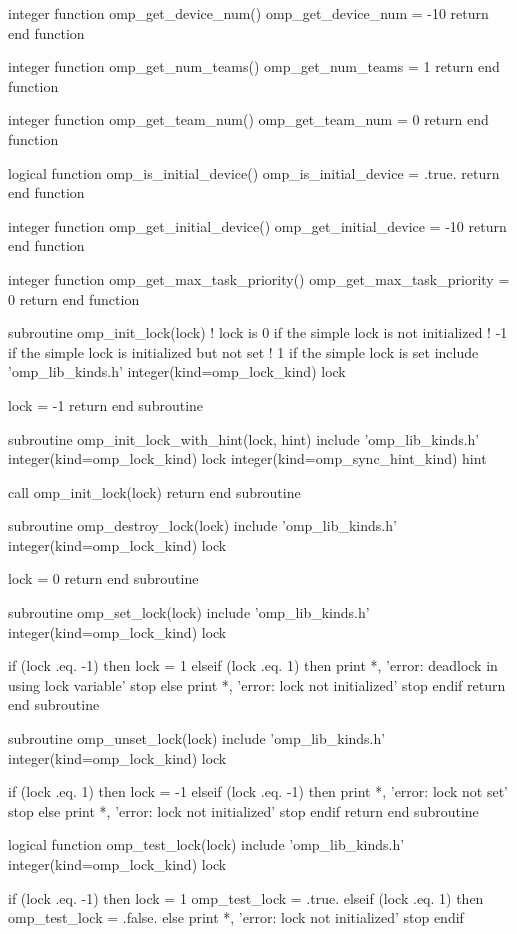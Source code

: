 {\begin{ompfFunction}
integer function omp_get_device_num()
  omp_get_device_num = -10
  return
end function

integer function omp_get_num_teams()
  omp_get_num_teams = 1
  return
end function

integer function omp_get_team_num()
  omp_get_team_num = 0
  return
end function

logical function omp_is_initial_device()
  omp_is_initial_device = .true.
  return
end function

integer function omp_get_initial_device()
  omp_get_initial_device = -10
  return
end function

integer function omp_get_max_task_priority()
  omp_get_max_task_priority = 0
  return
end function

subroutine omp_init_lock(lock)
  ! lock is 0 if the simple lock is not initialized
  !        -1 if the simple lock is initialized but not set
  !         1 if the simple lock is set
  include 'omp_lib_kinds.h'
  integer(kind=omp_lock_kind) lock

  lock = -1
  return
end subroutine

subroutine omp_init_lock_with_hint(lock, hint)
  include 'omp_lib_kinds.h'
  integer(kind=omp_lock_kind) lock
  integer(kind=omp_sync_hint_kind) hint

  call omp_init_lock(lock)
  return
end subroutine

subroutine omp_destroy_lock(lock)
  include 'omp_lib_kinds.h'
  integer(kind=omp_lock_kind) lock

  lock = 0
  return
end subroutine

subroutine omp_set_lock(lock)
  include 'omp_lib_kinds.h'
  integer(kind=omp_lock_kind) lock

  if (lock .eq. -1) then
    lock = 1
  elseif (lock .eq. 1) then
    print *, 'error: deadlock in using lock variable'
    stop
  else
    print *, 'error: lock not initialized'
    stop
  endif
  return
end subroutine

subroutine omp_unset_lock(lock)
  include 'omp_lib_kinds.h'
  integer(kind=omp_lock_kind) lock

  if (lock .eq. 1) then
    lock = -1
  elseif (lock .eq. -1) then
    print *, 'error: lock not set'
    stop
  else
    print *, 'error: lock not initialized'
    stop
  endif
  return
end subroutine

logical function omp_test_lock(lock)
  include 'omp_lib_kinds.h'
  integer(kind=omp_lock_kind) lock

  if (lock .eq. -1) then
    lock = 1
    omp_test_lock = .true.
  elseif (lock .eq. 1) then
    omp_test_lock = .false.
  else
    print *, 'error: lock not initialized'
    stop
  endif


\end{ompfFunction}}
